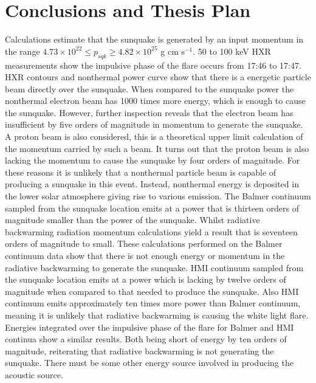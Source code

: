 \section{Conclusions and Thesis Plan}
Calculations estimate that the sunquake is generated by an input momentum in the range $4.73{\times}10^{22} \leq p_{sqk} \geq 4.82{\times}10^{25}$ g cm s$^{-1}$. 50 to 100 keV HXR measurements show the impulsive phase of the flare occurs from 17:46 to 17:47. HXR contours and nonthermal power curve show that there is a energetic particle beam directly over the sunquake. When compared to the sunquake power the nonthermal electron beam has 1000 times more energy, which is enough to cause the sunquake. However, further inspection reveals that the electron beam has insufficient by five orders of magnitude in momentum to generate the sunquake. A proton beam is also considered, this is a theoretical upper limit calculation of the momentum carried by such a beam. It turns out that the proton beam is also lacking the momentum to cause the sunquake by four orders of magnitude. For these reasons it is unlikely that a nonthermal particle beam is capable of producing a sunquake in this event. Instead, nonthermal energy is deposited in the lower solar atmosphere giving rise to various emission. The Balmer continuum sampled from the sunquake location emits at a power that is thirteen orders of magnitude smaller than the power of the sunquake. Whilst radiative backwarming radiation momentum calculations yield a result that is seventeen orders of magnitude to small. These calculations performed on the Balmer continuum data show that there is not enough energy or momentum in the radiative backwarming to generate the sunquake. HMI continuum sampled from the sunquake location emits at a power which is lacking by twelve orders of magnitude when compared to that needed to produce the sunquake. Also HMI continuum emits approximately ten times more power than Balmer continuum, meaning it is unlikely that radiative backwarming is causing the white light flare. Energies integrated over the impulsive phase of the flare for Balmer and HMI continua show a similar results. Both being short of energy by ten orders of magnitude, reiterating that radiative backwarming is not generating the sunquake. There must be some other energy source involved in producing the acoustic source. \\
\noindent

